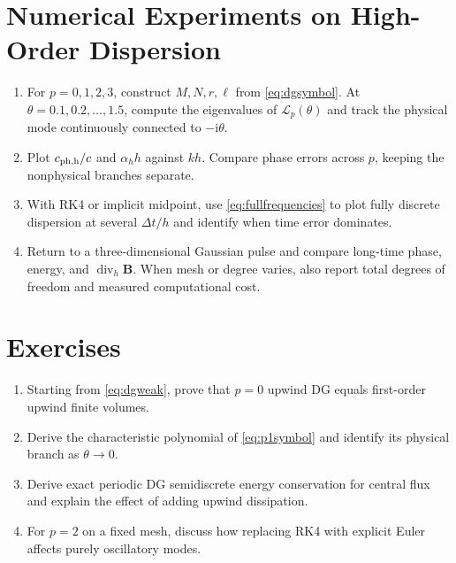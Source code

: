 \documentclass[11pt,openany]{book}
\numberwithin{equation}{chapter}
\theoremstyle{definition}
\theoremstyle{remark}
\newcommand{\Div}{\operatorname{div}}
\begin{document}
\section{Numerical Experiments on High-Order Dispersion}
\begin{enumerate}
\item For $p=0,1,2,3$, construct $M,N,r,\ell$ from \eqref{eq:dgsymbol}.
At $\theta=0.1,0.2,\ldots,1.5$, compute the eigenvalues of $\mathcal L_p(\theta)$ and track the physical mode continuously connected to $-\mathrm i\theta$.
\item Plot $c_{\rm ph,h}/c$ and $\alpha_hh$ against $kh$.
Compare phase errors across $p$, keeping the nonphysical branches separate.
\item With RK4 or implicit midpoint, use \eqref{eq:fullfrequencies} to plot fully discrete dispersion at several $\Delta t/h$ and identify when time error dominates.
\item Return to a three-dimensional Gaussian pulse and compare long-time phase, energy, and $\Div_h\bm B$.
When mesh or degree varies, also report total degrees of freedom and measured computational cost.
\end{enumerate}
\section{Exercises}
\begin{enumerate}
\item Starting from \eqref{eq:dgweak}, prove that $p=0$ upwind DG equals first-order upwind finite volumes.
\item Derive the characteristic polynomial of \eqref{eq:p1symbol} and identify its physical branch as $\theta\to0$.
\item Derive exact periodic DG semidiscrete energy conservation for central flux and explain the effect of adding upwind dissipation.
\item For $p=2$ on a fixed mesh, discuss how replacing RK4 with explicit Euler affects purely oscillatory modes.
\end{enumerate}
\end{document}
